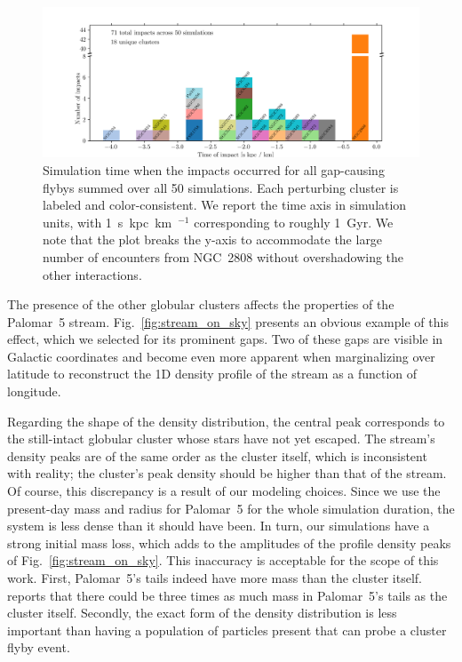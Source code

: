         \begin{figure}
            \centering
            \includegraphics[width=\linewidth]{images/histogram_impact_time.png}
            \caption[Simulation time when the impacts occurred for all gap-causing flybys]{Simulation time when the impacts occurred for all gap-causing flybys summed over all 50 simulations. Each perturbing cluster is labeled and color-consistent. We report the time axis in simulation units, with 1~s~kpc~km~$^{-1}$ corresponding to roughly 1~Gyr. We note that the plot breaks the y-axis to accommodate the large number of encounters from NGC~2808 without overshadowing the other interactions.}
            \label{fig:histogram_impact_time}
        \end{figure}

        The presence of the other globular clusters affects the properties of the Palomar~5 stream. Fig.~\ref{fig:stream_on_sky} presents an obvious example of this effect, which we selected for its prominent gaps. Two of these gaps are visible in Galactic coordinates and become even more apparent when marginalizing over latitude to reconstruct the 1D density profile of the stream as a function of longitude.     

        Regarding the shape of the density distribution, the central peak corresponds to the still-intact globular cluster whose stars have not yet escaped. The stream's density peaks are of the same order as the cluster itself, which is inconsistent with reality; the cluster's peak density should be higher than that of the stream. Of course, this discrepancy is a result of our modeling choices. Since we use the present-day mass and radius for Palomar~5 for the whole simulation duration, the system is less dense than it should have been. In turn, our simulations have a strong initial mass loss, which adds to the amplitudes of the profile density peaks of Fig.~\ref{fig:stream_on_sky}. This inaccuracy is acceptable for the scope of this work. First, Palomar~5's tails indeed have more mass than the cluster itself. \citet{2017ApJ...842..120I} reports that there could be three times as much mass in Palomar~5's tails as the cluster itself. Secondly, the exact form of the density distribution is less important than having a population of particles present that can probe a cluster flyby event.
    

